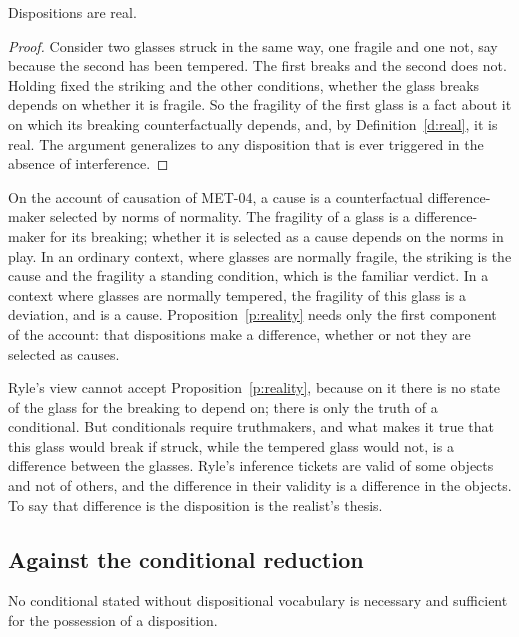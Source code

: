 \documentclass{situationist-preprint}
\begin{document}
\begin{proposition}[Reality]\label{p:reality}
Dispositions are real.
\end{proposition}

\begin{proof}
Consider two glasses struck in the same way, one fragile and one not, say because the second has been tempered. The first breaks and the second does not. Holding fixed the striking and the other conditions, whether the glass breaks depends on whether it is fragile. So the fragility of the first glass is a fact about it on which its breaking counterfactually depends, and, by Definition~\ref{d:real}, it is real. The argument generalizes to any disposition that is ever triggered in the absence of interference.
\end{proof}

On the account of causation of MET-04, a cause is a counterfactual difference-maker selected by norms of normality. The fragility of a glass is a difference-maker for its breaking; whether it is selected as a cause depends on the norms in play. In an ordinary context, where glasses are normally fragile, the striking is the cause and the fragility a standing condition, which is the familiar verdict. In a context where glasses are normally tempered, the fragility of this glass is a deviation, and is a cause. Proposition~\ref{p:reality} needs only the first component of the account: that dispositions make a difference, whether or not they are selected as causes.

Ryle's view cannot accept Proposition~\ref{p:reality}, because on it there is no state of the glass for the breaking to depend on; there is only the truth of a conditional. But conditionals require truthmakers, and what makes it true that this glass would break if struck, while the tempered glass would not, is a difference between the glasses. Ryle's inference tickets are valid of some objects and not of others, and the difference in their validity is a difference in the objects. To say that difference is the disposition is the realist's thesis.

\subsection{Against the conditional reduction}\label{s:conditionals}

\begin{lemma}\label{l:cond}
No conditional stated without dispositional vocabulary is necessary and sufficient for the possession of a disposition.
\end{lemma}
\end{document}
